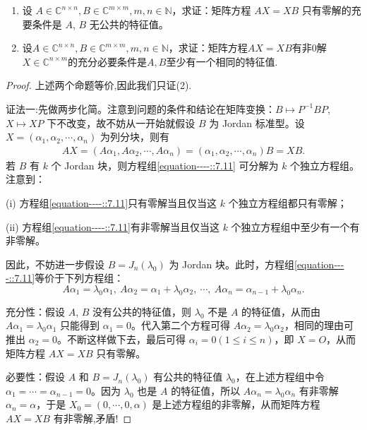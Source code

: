 \documentclass[../../main.tex]{subfiles}%
\begin{document}
\begin{proposition}[$AX=BX$经典结论]\label{proposition:AX-XB线性映射相关等价条件--(1)}
\begin{enumerate}[(1)]
\item 设 $A\in\mathbb{C}^{n\times n}, B\in\mathbb{C}^{m\times m}, m,n\in\mathbb{N}$，求证：矩阵方程 $AX = XB$ 只有零解的充要条件是 $A$, $B$ 无公共的特征值。

\item 设$A\in\mathbb{C}^{n\times n}, B\in\mathbb{C}^{m\times m}, m,n\in\mathbb{N}$，求证：矩阵方程$AX = XB$有非$0$解$X\in\mathbb{C}^{n\times m}$的充分必要条件是$A,B$至少有一个相同的特征值. 
\end{enumerate}
\end{proposition}
\begin{proof}

上述两个命题等价,因此我们只证(2).

{\color{blue} 证法一:}先做两步化简。注意到问题的条件和结论在矩阵变换：$B \mapsto P^{-1}BP$, $X \mapsto XP$ 下不改变，故不妨从一开始就假设 $B$ 为 Jordan 标准型。设 $X = (\alpha_1, \alpha_2, \cdots, \alpha_n)$ 为列分块，则有
\begin{align}
AX = (A\alpha_1, A\alpha_2, \cdots, A\alpha_n) = (\alpha_1, \alpha_2, \cdots, \alpha_n)B = XB. \label{equation----::7.11}
\end{align}
若 $B$ 有 $k$ 个 Jordan 块，则方程组\eqref{equation----::7.11} 可分解为 $k$ 个独立方程组。注意到：

(i) 方程组\eqref{equation----::7.11}只有零解当且仅当这 $k$ 个独立方程组都只有零解；

(ii) 方程组\eqref{equation----::7.11}有非零解当且仅当这 $k$ 个独立方程组中至少有一个有非零解。

因此，不妨进一步假设 $B = J_n(\lambda_0)$ 为 Jordan 块。此时，方程组\eqref{equation----::7.11}等价于下列方程组：
\[
A\alpha_1 = \lambda_0\alpha_1,~ A\alpha_2 = \alpha_1 + \lambda_0\alpha_2,~ \cdots,~ A\alpha_n = \alpha_{n - 1} + \lambda_0\alpha_n.
\]

{\heiti 充分性：}假设 $A$, $B$ 没有公共的特征值，则 $\lambda_0$ 不是 $A$ 的特征值，从而由 $A\alpha_1 = \lambda_0\alpha_1$ 只能得到 $\alpha_1 = 0$。代入第二个方程可得 $A\alpha_2 = \lambda_0\alpha_2$，相同的理由可推出 $\alpha_2 = 0$。不断这样做下去，最后可得 $\alpha_i = 0 (1 \leqslant  i \leqslant  n)$，即 $X = O$，从而矩阵方程 $AX = XB$ 只有零解。

{\heiti 必要性：}假设 $A$ 和 $B = J_n(\lambda_0)$ 有公共的特征值 $\lambda_0$，在上述方程组中令 $\alpha_1 = \cdots = \alpha_{n - 1} = 0$。因为 $\lambda_0$ 也是 $A$ 的特征值，所以 $A\alpha_n = \lambda_0\alpha_n$ 有非零解 $\alpha_n = \alpha$，于是 $X_0 = (0, \cdots, 0, \alpha)$ 是上述方程组的非零解，从而矩阵方程 $AX = XB$ 有非零解,矛盾!


\end{proof}
\end{document}
